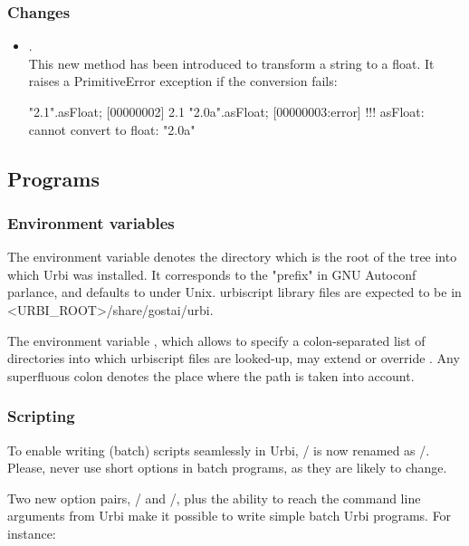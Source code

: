 \subsubsection{Changes}

\begin{itemize}
\item {}.\\
  This new method has been introduced to transform a string to a float.  It
  raises a PrimitiveError exception if the conversion fails:

\begin{urbiscript}
"2.1".asFloat;
[00000002] 2.1
"2.0a".asFloat;
[00000003:error] !!! asFloat: cannot convert to float: "2.0a"
\end{urbiscript}
\end{itemize}

\subsection{Programs}

\subsubsection{Environment variables}

The environment variable  denotes the directory which is the
root of the tree into which Urbi was installed.  It corresponds to the
"prefix" in GNU Autoconf parlance, and defaults to  under
Unix.  urbiscript library files are expected to be in
<URBI\_ROOT>/share/gostai/urbi.

The environment variable , which allows to specify a
colon-separated list of directories into which urbiscript files are
looked-up, may extend or override .  Any superfluous colon
denotes the place where the  path is taken into account.

\subsubsection{Scripting}

To enable writing (batch) scripts seamlessly in Urbi, 
/ is now renamed as /.
Please, never use short options in batch programs, as they are likely to
change.

Two new option pairs, / and
/, plus the ability to reach the command line
arguments from Urbi make it possible to write simple batch Urbi programs.
For instance:

